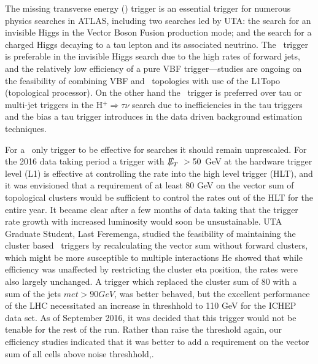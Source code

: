 The missing transverse energy (\met) trigger is an essential trigger for numerous physics searches in ATLAS, including two searches led by UTA:  the search for an invisible Higgs in the Vector Boson Fusion production mode; and the search for a charged Higgs decaying to a tau lepton and its associated neutrino.   The \met\ trigger is preferable in the invisible Higgs search due to the high rates of forward jets, and the relatively low efficiency of a pure VBF trigger—studies are ongoing on the feasibility of combining VBF and \met\ topologies with use of the L1Topo         (topological processor).  On the other hand the \met\ trigger is preferred over tau or multi-jet triggers in the H$^+ \Rightarrow\tau\nu$ search due to inefficiencies in the tau triggers and the bias a tau trigger introduces in the data driven background estimation techniques.

For a \met\ only trigger to be effective for searches it should remain unprescaled.
For the 2016 data taking period a trigger with $\met> 50$ GeV at the hardware trigger level (L1) is effective at controlling the rate into the high level trigger (HLT), and it was envisioned that a requirement of at least 80 GeV on the vector sum of topological clusters would be sufficient to control the rates out of the HLT for the entire year. It became clear after a few months of data taking that the trigger rate growth with increased luminosity would soon be unsustainable.   UTA Graduate Student, Last Feremenga, studied the feasibility of maintaining the cluster based \met\ triggers by recalculating the vector sum without forward clusters, which might be more susceptible to multiple interactions He showed that while efficiency was unaffected by restricting the cluster eta position, the rates were also largely unchanged.  A trigger which replaced the cluster sum of 80 with a sum of the jets 
$ met>90 GeV$, was better behaved, but the excellent performance of the LHC necessitated an increase in threshhold to 110 GeV for the ICHEP data set.  As of September 2016, it was decided that this trigger would not be tenable for the rest of the run. Rather than raise the threshold again, our efficiency studies indicated that it was better to add a requirement on the vector sum of all cells above noise threshhold,.


